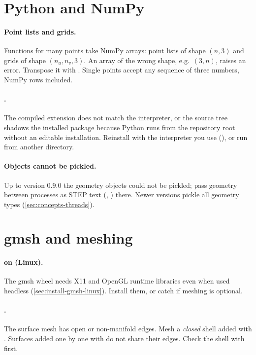 \section{Python and NumPy}\label{sec:ts-python}

\paragraph{Point lists and grids.} Functions for many points take NumPy arrays: point lists of
shape $(n,3)$ and grids of shape $(n_u,n_v,3)$. An array of the wrong shape, e.g.\ $(3,n)$,
raises an error. Transpose it with . Single points accept any sequence of three numbers,
NumPy rows included.

\paragraph{.} The compiled extension does not match the interpreter,
or the source tree shadows the installed package because Python runs from the repository root
without an editable installation. Reinstall with the interpreter you use (), or run from another directory.

\paragraph{Objects cannot be pickled.} Up to version 0.9.0 the geometry objects could not be
pickled; pass geometry between processes as STEP text (, )
there. Newer versions pickle all geometry types (\cref{sec:concepts-threads}).

\section{gmsh and meshing}\label{sec:ts-gmsh}

\paragraph{ on  (Linux).} The gmsh wheel needs X11 and OpenGL
runtime libraries even when used headless (\cref{sec:install-gmsh-linux}). Install them, or
catch  if meshing is optional.

\paragraph{.} The surface mesh has open
or non-manifold edges. Mesh a \emph{closed} shell added with . Surfaces added one
by one with  do not share their edges. Check the shell with
 first.

